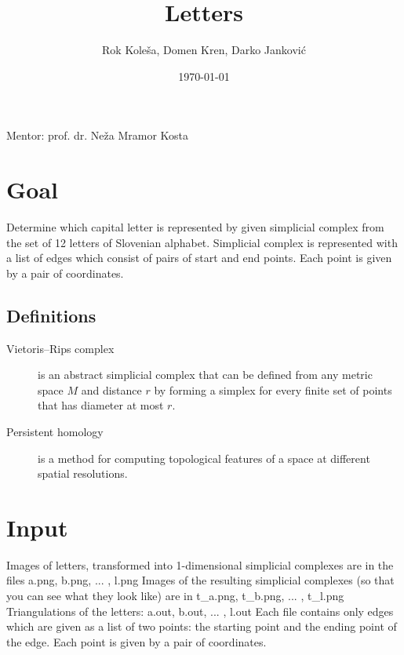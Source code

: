 \documentclass{article}
\title{Letters} %
\author{Rok Koleša, Domen Kren, Darko Janković} %
\date{\today} %
\begin{document}
\maketitle %

\begin{center}
Mentor: prof. dr. Neža Mramor Kosta %
\end{center}


\newpage
\tableofcontents
\newpage

\section{Goal}
  Determine which capital letter is represented by given simplicial complex from the set of 12 letters of Slovenian alphabet. Simplicial complex is represented with a list of edges which consist of pairs of start and end points. Each point is given by a pair of coordinates.


\subsection{Definitions}
\label{definicije}
\begin{description}
\item[Vietoris–Rips complex] is an abstract simplicial complex that can be defined from any metric space $M$ and distance $r$ by forming a simplex for every finite set of points that has diameter at most $r$.
\item[Persistent homology] is a method for computing topological features of a space at different spatial resolutions.
\end{description} 
 

\section{Input}
Images of letters, transformed into 1-dimensional simplicial complexes are in the files
a.png, b.png, ... , l.png
Images of the resulting simplicial complexes (so that you can see what they look like) are
in t\_a.png, t\_b.png, ... , t\_l.png
Triangulations of the letters: a.out, b.out, ... , l.out
Each file contains only edges which are given as a list of two points: the starting point
and the ending point of the edge. Each point is given by a pair of coordinates.
\end{document}
